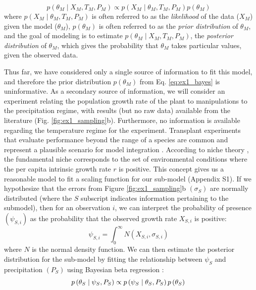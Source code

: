 \documentclass[11pt]{article}
\begin{document}
\begin{equation}
\label{eq:ex1_bayes}
	p\left (\theta_M \mid X_M,T_M,P_M \right ) \propto 
	p \left(X_M \mid \theta_M, T_M, P_M \right)
	p \left(\theta_M \right)
\end{equation}
where \(p\left(X_M \mid \theta_M, T_M, P_M \right)\) is often referred to as the \emph{likelihood} of the data (\(X_M\)) given the model (\(\theta_M\)), \(p\left(\theta_M \right)\) is often referred to as the \emph{prior distribution} of \(\theta_M\), and the goal of modeling is to estimate \(p\left (\theta_M \mid X_M,T_M,P_M \right )\), the \emph{posterior distribution} of \(\theta_M\), which gives the probability that \(\theta_M\) takes particular values, given the observed data.

Thus far, we have considered only a single source of information to fit this model, and therefore the prior distribution \(p\left(\theta_M \right)\) from Eq. \ref{eq:ex1_bayes} is uninformative.
As a secondary source of information, we will consider an experiment relating the population growth rate of the plant to manipulations to the precipitation regime, with results (but no raw data) available from the literature (Fig. \ref{fig:ex1_sampling}b). 
Furthermore, no information is available regarding the temperature regime for the experiment.
Transplant experiments that evaluate performance beyond the range of a species are common and represent a plausible scenario for model integration \citep{Hargreaves2014}.
According to niche theory \citep{Holt2009}, the fundamental niche corresponds to the set of environmental conditions where the per capita intrinsic growth rate $r$ is positive.
This concept gives us a reasonable model to fit a scaling function for our sub-model (Appendix S1).
If we hypothesize that the errors from Figure \ref{fig:ex1_sampling}b \( \left(\sigma_{S} \right) \) are normally distributed (where the \(S\) subscript indicates information pertaining to the submodel), then for an observation $i$, we can interpret the probability of presence \( \left(\psi_{S,i}\right)\) as the probability that the observed growth rate \(X_{S,i}\) is positive:
\begin{equation}
	\psi_{S,i} = \int_0^\infty N \left(X_{S,i}, \sigma_{S,i} \right)
\end{equation}
where \(N\) is the normal density function.
We can then estimate the posterior distribution for the sub-model by fitting the relationship between \(\psi_S\) and precipitation \( \left( P_S \right) \) using Bayesian beta regression \citep{Ferrari2004}:
\begin{equation}
\label{eq:ex1_thetas}
	p\left (\theta_S \mid \psi_S,P_S \right ) \propto 
	p \left(\psi_S \mid \theta_S, P_S \right)
	p \left(\theta_S \right) \\
\end{equation}
\end{document}
